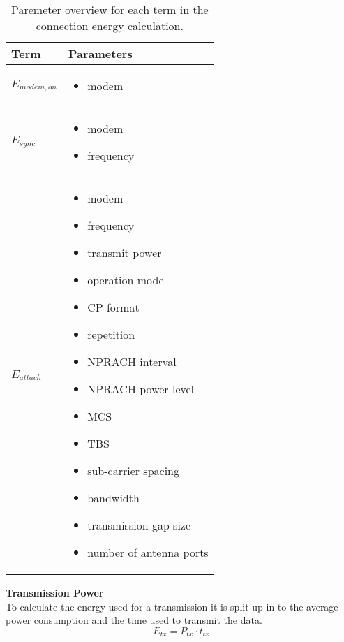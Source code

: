 \begin{table}[H]
\centering
\begin{tabular}{|m{3cm}|m{6cm}|} \hline
\textbf{Term} & \textbf{Parameters} \\ \hline
$E_{modem,on}$ & \begin{itemize} 
\item modem
\end{itemize} \\ \hline
$E_{sync}$ & \begin{itemize}
\item modem
\item frequency
\end{itemize} \\ \hline
$E_{attach}$ & \begin{itemize}
\item modem 
\item frequency
\item transmit power
\item operation mode
\item \gls{CP}-format
\item repetition
\item NPRACH interval
\item NPRACH power level
\item \gls{MCS}
\item \gls{TBS}
\item sub-carrier spacing
\item bandwidth
\item transmission gap size
\item number of antenna ports
\end{itemize} \\ \hline
\end{tabular}
\caption{Paremeter overview for each term in the connection energy calculation.}
\label{tab:Econn_parameter_overview}
\end{table}



\textbf{Transmission Power}\\
To calculate the energy used for a transmission it is split up in to the average power consumption and the time used to transmit the data. 
\begin{equation}
E_{tx} = P_{tx}\cdot t_{tx}
\end{equation}
\begin{where}
\end{where}

